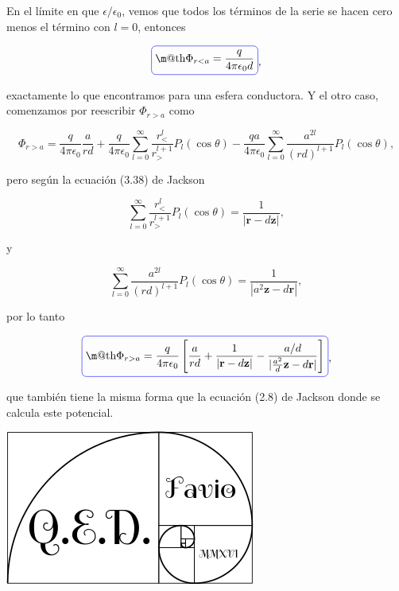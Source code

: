 \documentclass[a4paper,11pt]{article}
\makeatletter
\numberwithin{equation}{section}
\newcommand*{\boxcolor}{blue}
\renewcommand{\boxed}[1]{\textcolor{\boxcolor}{%
\tikz[baseline={([yshift=-1ex]current bounding box.center)}] \node [rectangle, minimum width=1ex,rounded corners,draw] {\normalcolor\m@th$\displaystyle#1$};}}
\makeatother
\begin{document}
 En el límite en que $\epsilon/\epsilon_0$, vemos que todos los términos 
de la serie se hacen cero menos el término con $l=0$, entonces 

\begin{equation}
 \boxed{\Phi_{r < a} = \frac{q}{4\pi\epsilon_0d}},
\end{equation}

exactamente lo que encontramos para una esfera conductora. Y el otro caso, comenzamos 
por reescribir $\Phi_{r > a}$ como 

\begin{equation}
 \Phi_{r > a} = \frac{q}{4\pi\epsilon_0}\frac{a}{rd} + \frac{q}{4\pi\epsilon_0} 
 \sum_{l=0}^\infty \frac{r_{<}^l}{r_{>}^{l+1}}P_l(\cos{\theta}) - 
 \frac{qa}{4\pi\epsilon_0}\sum_{l=0}^\infty \frac{a^{2l}}{(rd)^{l+1}}P_l(\cos{\theta}),
\end{equation}

pero según la ecuación (3.38) de Jackson \cite{jackson}

\begin{equation}
  \sum_{l=0}^\infty \frac{r_{<}^l}{r_{>}^{l+1}}P_l(\cos{\theta}) = 
  \frac{1}{|\mathbf{r} - d\mathbf{z}|},
\end{equation}

y 

\begin{equation}
 \sum_{l=0}^\infty \frac{a^{2l}}{(rd)^{l+1}}P_l(\cos{\theta}) = 
 \frac{1}{|a^2\mathbf{z} - d\mathbf{r}|},
\end{equation}

por lo tanto 

\begin{equation}
 \boxed{\Phi_{r > a} = \frac{q}{4\pi\epsilon_0}\left[\frac{a}{rd} + 
 \frac{1}{|\mathbf{r} - d\mathbf{z}|} -
  \frac{a/d}{|\frac{a^2}{d}\mathbf{z} - d\mathbf{r}|}\right]},
\end{equation}

que también tiene la misma forma que la ecuación (2.8) de Jackson \cite{jackson} 
donde se calcula este potencial.

\hspace{10cm}\includegraphics[scale=0.25]{logoQED}
\end{document}
